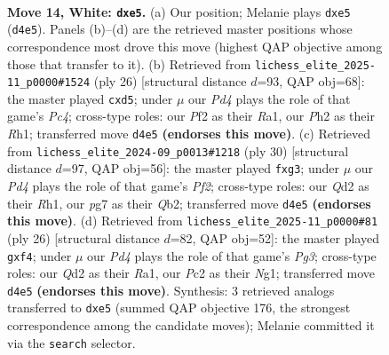 \documentclass[11pt]{article}
\begin{document}
\begin{figure}[p]\centering
\begin{subfigure}{0.46\textwidth}\centering
\resizebox{\linewidth}{!}{%
\newchessgame
\chessboard[
  setfen={rnb1r2k/p2nq1pp/1pp1p3/3pp3/3P4/2N5/PPPQ1PPP/2K1RBNR w - - 0 14},
  showmover=false,
  pgfstyle=straightmove, color=movearrow, markmove={d4-e5}
]}
\caption{}
\end{subfigure}\hfill
\begin{subfigure}{0.46\textwidth}\centering
\resizebox{\linewidth}{!}{%
\newchessgame
\chessboard[
  setfen={r1bqr1k1/p1p2pp1/2p2n2/3p3p/2PPp2P/2N3P1/PP1QPPB1/R3K2R w KQ - 3 14},
  showmover=false,
  pgfstyle=straightmove, color=movearrow, markmove={c4-d5}
]}
\caption{}
\end{subfigure}
\\[4pt]
\begin{subfigure}{0.46\textwidth}\centering
\resizebox{\linewidth}{!}{%
\newchessgame
\chessboard[
  setfen={r2qrn2/ppp2pk1/3p1np1/5b2/1PPPp3/2N1P1pP/PQ1NBP2/R3K2R w KQ - 0 16},
  showmover=false,
  pgfstyle=straightmove, color=movearrow, markmove={f2-g3}
]}
\caption{}
\end{subfigure}\hfill
\begin{subfigure}{0.46\textwidth}\centering
\resizebox{\linewidth}{!}{%
\newchessgame
\chessboard[
  setfen={r1bq1r1k/pp2n2p/2np1p1P/2p1p3/4Pp2/2NP2P1/PPPQ2B1/R3K1NR w KQ - 0 14},
  showmover=false,
  pgfstyle=straightmove, color=movearrow, markmove={g3-f4}
]}
\caption{}
\end{subfigure}
\caption{\textbf{Move 14, White: \texttt{dxe5}.} (a) Our position; Melanie plays \texttt{dxe5} (\texttt{d4e5}). Panels (b)--(d) are the retrieved master positions whose correspondence most drove this move (highest QAP objective among those that transfer to it). (b) Retrieved from \texttt{lichess\_elite\_2025-11\_p0000\#1524} (ply 26) [structural distance $d$=93, QAP obj=68]: the master played \texttt{cxd5}; under $\mu$ our \emph{Pd4} plays the role of that game's \emph{Pc4}; cross-type roles: our \emph{P}f2 as their \emph{R}a1, our \emph{P}h2 as their \emph{R}h1; transferred move \texttt{d4e5} \textbf{(endorses this move)}. (c) Retrieved from \texttt{lichess\_elite\_2024-09\_p0013\#1218} (ply 30) [structural distance $d$=97, QAP obj=56]: the master played \texttt{fxg3}; under $\mu$ our \emph{Pd4} plays the role of that game's \emph{Pf2}; cross-type roles: our \emph{Q}d2 as their \emph{R}h1, our \emph{p}g7 as their \emph{Q}b2; transferred move \texttt{d4e5} \textbf{(endorses this move)}. (d) Retrieved from \texttt{lichess\_elite\_2025-11\_p0000\#81} (ply 26) [structural distance $d$=82, QAP obj=52]: the master played \texttt{gxf4}; under $\mu$ our \emph{Pd4} plays the role of that game's \emph{Pg3}; cross-type roles: our \emph{Q}d2 as their \emph{R}a1, our \emph{P}c2 as their \emph{N}g1; transferred move \texttt{d4e5} \textbf{(endorses this move)}. Synthesis: 3 retrieved analogs transferred to \texttt{dxe5} (summed QAP objective 176, the strongest correspondence among the candidate moves); Melanie committed it via the \texttt{search} selector.}
\label{fig:thought-m26}
\end{figure}
\end{document}
